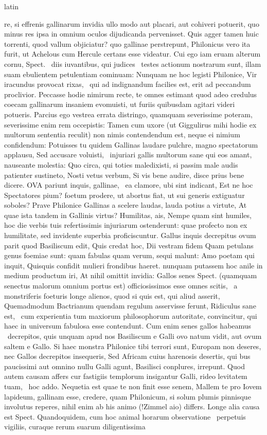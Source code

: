 \documentclass[12pt]{book}
\renewenvironment{latin}
    	{\begin{hyphenrules}{latin}}
    	{\end{hyphenrules}}
\begin{document}
\begin{pages}
\begin{latin}
\begin{Leftside}
re, si effrenis gallinarum invidia ullo modo aut placari, aut cohiveri potuerit, quo minus res ipsa in omnium oculos dijudicanda pervenisset. Quis agger tamen huic torrenti, quod vallum objiciatur? quo gallinae perstrepunt, Philonicus vero ita furit, ut Achelous cum Hercule certans esse videatur. Cui ego iam eruam alterum cornu, Spect. ﻿\ampersand\ diis iuvantibus, qui judices ﻿\ampersand\ testes actionum nostrarum sunt, illam suam ebulientem petulentiam cominuam: Nunquam ne hoc legisti Philonice, Vir iracundus provocat rixas, ﻿\ampersand\ qui ad indignandum facilies est, erit ad peccandum proclivior. Peccasse hodie nimirum recte, te omnes estimant quod adeo credulus coecam gallinarum insaniem evomuisti, ut furiis quibusdam agitari videri potueris. Parcius ego vestrea errata distringo, quamquam severissime poteram, severissime enim rem occepistis: Tamen cum uxore (ut Giggulirus mihi hodie ex multorum sententia reculit) non nimis contendendum est, neque ei nimium confidendum: Potuisses tu quidem Gallinas laudare pulchre, magno spectatorum applausu, Sed accusare voluisti, ﻿\ampersand\ injuriari gallis multorum sane qui eos amant, nauseante molestia: Quo circa, qui toties maledixisti, si passim male audis patienter sustineto, Nosti vetus verbum, Si vis bene audire, disce prius bene dicere. OVA pariunt inquis, gallinae, ﻿\ampersand\ ea clamore, ubi sint indicant, Est ne hoc Spectatores pium? foetum prodere, ut abortus fiat, ut sui generis extiguatur soboles? Prave Philonice Gallinas a scelere laudas,   lauda potius a virtute, At quae ista tandem in Gallinis virtus? Humilitas, ais, Nempe quam sint humiles, hoc die verbis tuis refertissimis injuriarum ostenderunt: quae profecto non ex humilitate, sed invidente superbia proficiscuntur. Gallus inquis decrepitus ovum parit quod Basiliscum edit, Quis credat hoc, Dii vestram fidem Quam petulans genus foemiae sunt: quam fabulas quam verum, sequi malunt: Amo poetam qui inquit, Quisquis confidit mulieri frondibus haeret. nunquam putassem hoc anile in medium productum iri, At nihil omittit invidia: Gallos senes Spect. (quamquam senectus malorum omnium portus est) officiosissimos esse omnes scitis, ﻿\ampersand\ a monstriferis foeturis longe alienos, quod si quis est, qui aliud asserit, Quemadmodum Bactrianum quendam regulum asservisse ferunt, Ridiculus sane est, ﻿\ampersand\ cum experientia tum maxiorum philosophorum autoritate, convincitur, qui haec in universum fabulosa esse contendunt. Cum enim senes gallos habeamus ﻿\ampersand\ decrepitos, quis unquam apud nos Basiliscum e Galli ovo natum vidit, aut ovum saltem e Gallo. Si haec monstra Philonice tibi terrori sunt, Europam non deseres, nec Gallos decrepitos insequeris, Sed Africam cuius harenosis desertis, qui bus paucissimi aut omnino nullu Galli agunt, Basilisci conplures, irrepunt. Quod autem causam affers cur fastigiis templorum insigantur Galli, rideo levitatem tuam, ﻿\ampersand\ hoc addo. Nequetia est quae te non finit esse senem, Mallem te pro Iovem lapideum, gallinam esse, credere, quam Philonicum, si solum plumis pinnisque involutus reperes, nihil enim ab his animo (!Zimmel aio) differs. Longe alia causa est Spect. Quandoquidem, cum hoc animal horarum observatione ﻿\ampersand\ perpetuis vigiliis, curaque rerum suarum diligentissima 
\end{Leftside}
\end{latin}
\end{pages}
\end{document}

